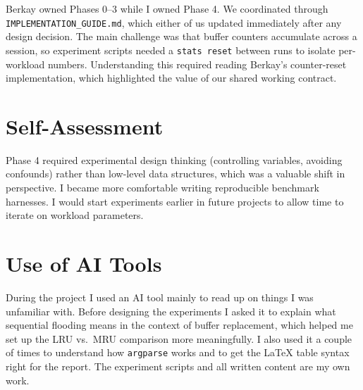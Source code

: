 \documentclass[12pt]{article}
\begin{document}
Berkay owned Phases 0–3 while I owned Phase 4. We coordinated through \texttt{IMPLEMENTATION\_GUIDE.md}, which either of us updated immediately after any design decision. The main challenge was that buffer counters accumulate across a session, so experiment scripts needed a \texttt{stats reset} between runs to isolate per-workload numbers. Understanding this required reading Berkay's counter-reset implementation, which highlighted the value of our shared working contract.

\section{Self-Assessment}

Phase 4 required experimental design thinking (controlling variables, avoiding confounds) rather than low-level data structures, which was a valuable shift in perspective. I became more comfortable writing reproducible benchmark harnesses. I would start experiments earlier in future projects to allow time to iterate on workload parameters.

\section{Use of AI Tools}

During the project I used an AI tool mainly to read up on things I was
unfamiliar with. Before designing the experiments I asked it to explain what
sequential flooding means in the context of buffer replacement, which helped me
set up the LRU vs.\ MRU comparison more meaningfully. I also used it a couple
of times to understand how \texttt{argparse} works and to get the \LaTeX{}
table syntax right for the report. The experiment scripts and all written
content are my own work.
\end{document}
